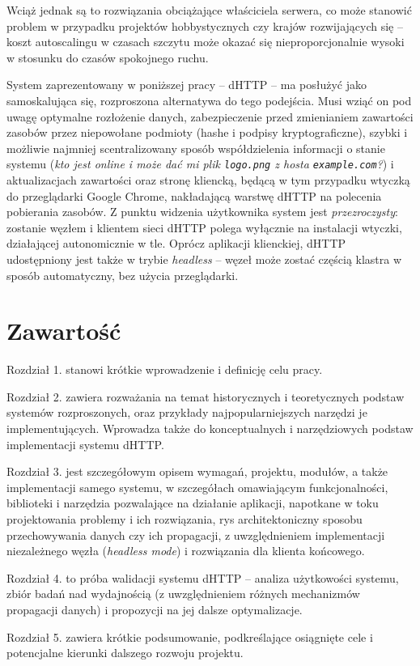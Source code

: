 Wciąż jednak są to rozwiązania obciążające właściciela serwera, co może stanowić problem w przypadku projektów hobbystycznych czy krajów rozwijających się -- koszt autoscalingu w czasach szczytu może okazać się nieproporcjonalnie wysoki w stosunku do czasów spokojnego ruchu.


System zaprezentowany w poniższej pracy -- dHTTP -- ma posłużyć jako samoskalująca się, rozproszona alternatywa do tego podejścia. Musi wziąć on pod uwagę optymalne rozłożenie danych, zabezpieczenie przed zmienianiem zawartości zasobów przez niepowołane podmioty (hashe i podpisy kryptograficzne), szybki i możliwie najmniej scentralizowany sposób współdzielenia informacji o stanie systemu ({\em kto jest online i może dać mi plik \texttt{logo.png} z hosta \texttt{example.com}?}) i aktualizacjach zawartości oraz stronę kliencką, będącą w tym przypadku wtyczką do przeglądarki Google Chrome, nakładającą warstwę dHTTP na polecenia pobierania zasobów. Z punktu widzenia użytkownika system jest {\em przezroczysty}: zostanie  węzłem i klientem sieci dHTTP polega wyłącznie na instalacji wtyczki, działającej autonomicznie w tle. Oprócz aplikacji klienckiej, dHTTP udostępniony jest także w trybie {\em headless} -- węzeł może zostać częścią klastra w sposób automatyczny, bez użycia przeglądarki.

\section{Zawartość}
\label{sec:zawartosc}

Rozdział 1. stanowi krótkie wprowadzenie i definicję celu pracy. 

Rozdział 2. zawiera rozważania na temat historycznych i teoretycznych podstaw systemów rozproszonych, oraz przykłady najpopularniejszych narzędzi je implementujących. Wprowadza także do konceptualnych i narzędziowych podstaw implementacji systemu dHTTP. 

Rozdział 3. jest szczegółowym opisem wymagań, projektu, modułów, a także implementacji samego systemu, w szczegółach omawiającym funkcjonalności, biblioteki i narzędzia pozwalające na działanie aplikacji, napotkane w toku projektowania problemy i ich rozwiązania, rys architektoniczny sposobu przechowywania danych czy ich propagacji, z uwzględnieniem implementacji niezależnego węzła ({\em headless mode}) i rozwiązania dla klienta końcowego.

Rozdział 4. to próba walidacji systemu dHTTP – analiza użytkowości systemu, zbiór badań nad wydajnością (z uwzględnieniem różnych mechanizmów propagacji danych) i propozycji na jej dalsze optymalizacje.

Rozdział 5. zawiera krótkie podsumowanie, podkreślające osiągnięte cele i potencjalne kierunki dalszego rozwoju projektu.

